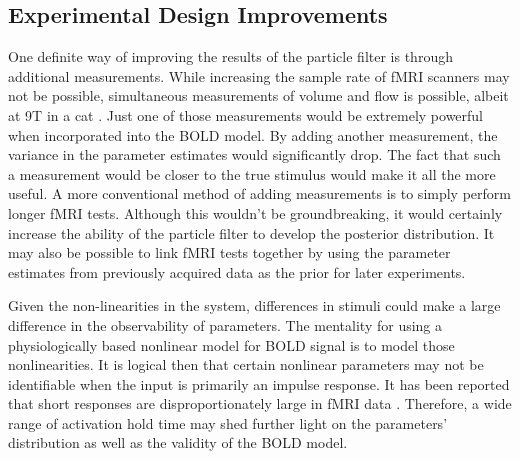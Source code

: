\subsection{Experimental Design Improvements}
\label{sec:Sideways Measurements}
One definite way of improving the results of the particle filter is through
additional measurements. While increasing the sample rate of \ac{fMRI} scanners may
not be possible, simultaneous measurements of volume and flow is
possible, albeit at 9T in a cat \cite{Hu2009}. Just one of those measurements
would be extremely powerful when incorporated into the \ac{BOLD}
model. By adding another measurement, the
variance in the parameter estimates would significantly drop. The fact
that such a measurement would be closer to the true stimulus would make it
all the more useful.
A more conventional method of adding measurements is to
simply perform longer \ac{fMRI} tests. Although this wouldn't be
groundbreaking, it would certainly increase the ability of the
particle filter to develop the posterior distribution.
It may also be possible to link \ac{fMRI} tests together
by using the parameter estimates from previously acquired
data as the prior for later experiments. 

Given the non-linearities in the system, differences in stimuli
could make a large difference in the observability of parameters. The mentality
for using a physiologically based nonlinear model for \ac{BOLD} signal is to model
those nonlinearities. It is logical then that certain nonlinear parameters may not
be identifiable when the input is primarily an impulse response. It
has been reported that short responses are disproportionately large
in \ac{fMRI} data \cite{Miller2001, Deneux2006}. Therefore,
a wide range of activation hold time may shed further light on
the parameters' distribution as well as the validity of the \ac{BOLD} model.

